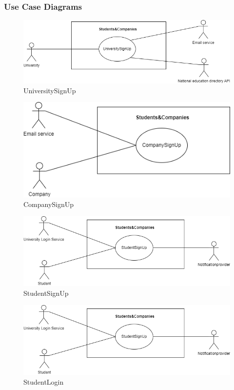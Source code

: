 \documentclass{article}
\begin{document}
\subsubsection{Use Case Diagrams}
\begin{figure}[H]
    \centering
    \includegraphics[scale = 0.45]{figures/UseCasesDiagrams/UniversityLogin.drawio.png}
    \caption{UniversitySignUp}
    \centering
\end{figure}
\begin{figure}[H]
    \centering
    \includegraphics[scale = 0.45]{figures/UseCasesDiagrams/use_case_1-CompanyLogin.drawio.png}
    \caption{CompanySignUp}
    \centering
\end{figure}
\begin{figure}[H]
    \centering
    \includegraphics[scale = 0.45]{figures/UseCasesDiagrams/use_case_1-StudentLogin.drawio.png}
    \caption{StudentSignUp}
    \centering
\end{figure}
\begin{figure}[H]
    \centering
    \includegraphics[scale = 0.45]{figures/UseCasesDiagrams/use_case_1-StudentLogin.drawio.png}
    \caption{StudentLogin}
    \centering
\end{figure}
\end{document}
